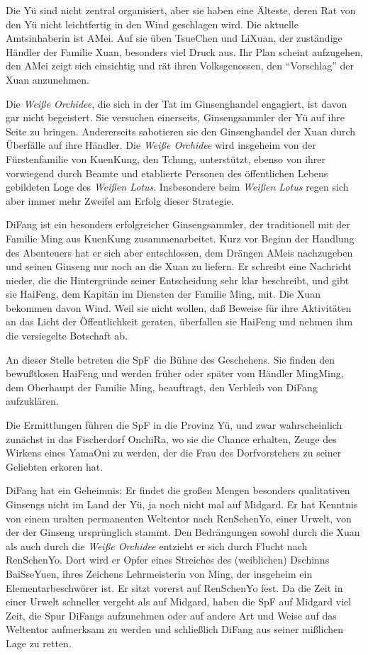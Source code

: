 \documentclass[
a4paper,
twoside,
DIV=calc,
BCOR=4mm,
fontsize=9pt,
twocolumn=on,
titlepage=on,
parskip=half
]{scrartcl}
\begin{document}
Die Yü sind nicht zentral organisiert, aber sie haben eine Älteste,
deren Rat von den Yü nicht leichtfertig in den Wind geschlagen
wird. Die aktuelle Amtsinhaberin ist AMei. Auf sie üben TsueChen und
LiXuan, der zuständige Händler der Familie Xuan, besonders viel
Druck aus. Ihr Plan scheint aufzugehen, den AMei zeigt sich einsichtig
und rät ihren Volksgenossen, den "`Vorschlag"' der Xuan anzunehmen.

Die \emph{Weiße Orchidee}, die sich in der Tat im Ginsenghandel
engagiert, ist davon gar nicht begeistert. Sie versuchen einerseits,
Ginsengsammler der Yü auf ihre Seite zu bringen. Andererseits
sabotieren sie den Ginsenghandel der Xuan durch Überfälle auf ihre
Händler. Die \emph{Weiße Orchidee} wird insgeheim von der
Fürstenfamilie von KuenKung, den Tchung, unterstützt, ebenso von ihrer
vorwiegend durch Beamte und etablierte Personen des öffentlichen
Lebens gebildeten Loge des \emph{Weißen Lotus}. Insbesondere beim
\emph{Weißen Lotus} regen sich aber immer mehr Zweifel am Erfolg
dieser Strategie.

DiFang ist ein besonders erfolgreicher Ginsengsammler, der
traditionell mit der Familie Ming aus KuenKung zusammenarbeitet. Kurz
vor Beginn der Handlung des Abenteuers hat er sich aber entschlossen,
dem Drängen AMeis nachzugeben und seinen Ginseng nur noch an die Xuan
zu liefern. Er schreibt eine Nachricht nieder, die die Hintergründe
seiner Entscheidung sehr klar beschreibt, und gibt sie HaiFeng, dem
Kapitän im Diensten der Familie Ming, mit. Die Xuan bekommen davon
Wind. Weil sie nicht wollen, daß Beweise für ihre Aktivitäten an das
Licht der Öffentlichkeit geraten, überfallen sie HaiFeng und nehmen
ihm die versiegelte Botschaft ab.

An dieser Stelle betreten die SpF die Bühne des Geschehens. Sie finden
den bewußtlosen HaiFeng und werden früher oder später vom Händler
MingMing, dem Oberhaupt der Familie Ming, beauftragt, den Verbleib von
DiFang aufzuklären.

Die Ermittlungen führen die SpF in die Provinz Yü, und zwar
wahrscheinlich zunächst in das Fischerdorf OnchiRa, wo sie die Chance
erhalten, Zeuge des Wirkens eines YamaOni zu werden, der die Frau des
Dorfvorstehers zu seiner Geliebten erkoren hat.

DiFang hat ein Geheimnis: Er findet die großen Mengen besonders
qualitativen Ginsengs nicht im Land der Yü, ja noch nicht mal auf
Midgard. Er hat Kenntnis von einem uralten permanenten Weltentor nach
RenSchenYo, einer Urwelt, von der der Ginseng ursprünglich stammt. Den
Bedrängungen sowohl durch die Xuan als auch durch die \emph{Weiße
  Orchidee} entzieht er sich durch Flucht nach RenSchenYo. Dort wird
er Opfer eines Streiches des (weiblichen) Dschinns BaiSseYuen, ihres
Zeichens Lehrmeisterin von Ming, der insgeheim ein Elementarbeschwörer
ist. Er sitzt vorerst auf RenSchenYo fest. Da die Zeit in einer Urwelt
schneller vergeht als auf Midgard, haben die SpF auf Midgard viel
Zeit, die Spur DiFangs aufzunehmen oder auf andere Art und Weise auf
das Weltentor aufmerksam zu werden und schließlich DiFang aus seiner
mißlichen Lage zu retten.
\end{document}
